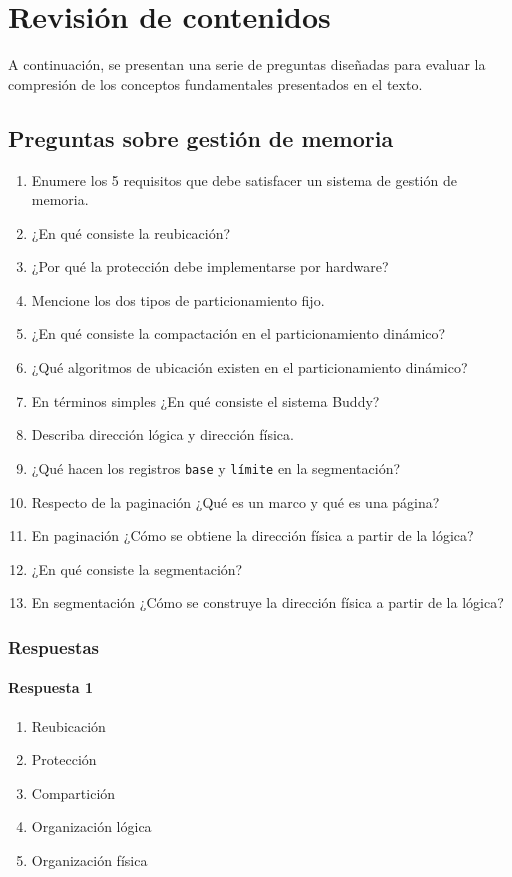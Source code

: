 \section{Revisión de contenidos}

A continuación, se presentan una serie de preguntas diseñadas para evaluar la compresión de los conceptos fundamentales presentados en el texto.

\subsection{Preguntas sobre gestión de memoria}

\begin{enumerate}
  \item Enumere los 5 requisitos que debe satisfacer un sistema de gestión de memoria.
  \item ¿En qué consiste la reubicación?
  \item ¿Por qué la protección debe implementarse por hardware?
  \item Mencione los dos tipos de particionamiento fijo.
  \item ¿En qué consiste la compactación en el particionamiento dinámico?
  \item ¿Qué algoritmos de ubicación existen en el particionamiento dinámico?
  \item En términos simples ¿En qué consiste el sistema Buddy?
  \item Describa dirección lógica y dirección física.
  \item ¿Qué hacen los registros \texttt{base} y \texttt{límite} en la segmentación?
  \item Respecto de la paginación ¿Qué es un marco y qué es una página?
  \item En paginación ¿Cómo se obtiene la dirección física a partir de la lógica?
  \item ¿En qué consiste la segmentación?
  \item En segmentación ¿Cómo se construye la dirección física a partir de la lógica?
\end{enumerate}

\subsubsection*{Respuestas}

\paragraph{Respuesta 1}
\begin{enumerate}
  \item Reubicación
  \item Protección 
  \item Compartición
  \item Organización lógica
  \item Organización física
\end{enumerate}

